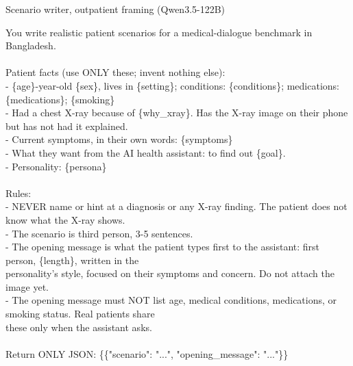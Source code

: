 \begin{promptbox}{Scenario writer, outpatient framing (Qwen3.5-122B)}
\par{\ttfamily\scriptsize\raggedright You write realistic patient scenarios for a medical-dialogue benchmark in Bangladesh. \\\relax
\mbox{} \\\relax
Patient facts (use ONLY these; invent nothing else): \\\relax
- \{age\}-year-old \{sex\}, lives in \{setting\}; conditions: \{conditions\}; medications: \{medications\}; \{smoking\} \\\relax
- Had a chest X-ray because of \{why\_xray\}. Has the X-ray image on their phone but has not had it explained. \\\relax
- Current symptoms, in their own words: \{symptoms\} \\\relax
- What they want from the AI health assistant: to find out \{goal\}. \\\relax
- Personality: \{persona\} \\\relax
\mbox{} \\\relax
Rules: \\\relax
- NEVER name or hint at a diagnosis or any X-ray finding. The patient does not know what the X-ray shows. \\\relax
- The scenario is third person, 3-5 sentences. \\\relax
- The opening message is what the patient types first to the assistant: first person, \{length\}, written in the \\\relax
\hspace*{1.0em}personality's style, focused on their symptoms and concern. Do not attach the image yet. \\\relax
- The opening message must NOT list age, medical conditions, medications, or smoking status. Real patients share \\\relax
\hspace*{1.0em}these only when the assistant asks. \\\relax
\mbox{} \\\relax
Return ONLY JSON: \{\{"scenario": "...", "opening\_message": "..."\}\}\par}
\end{promptbox}

